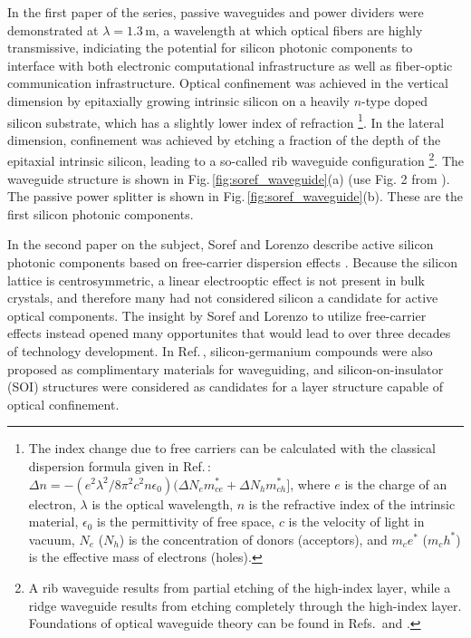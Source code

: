In the first paper of the series, passive waveguides and power dividers were demonstrated at $\lambda = 1.3$\,\textmu m, a wavelength at which optical fibers are highly transmissive, indiciating the potential for silicon photonic components to interface with both electronic computational infrastructure as well as fiber-optic communication infrastructure. Optical confinement was achieved in the vertical dimension by epitaxially growing intrinsic silicon on a heavily $n$-type doped silicon substrate, which has a slightly lower index of refraction \footnote{The index change due to free carriers can be calculated with the classical dispersion formula given in Ref.\,\cite{sole1985}: $\Delta n = -(e^2\lambda^2/8\pi^2 c^2n\epsilon_0)(\Delta N_em_{ce}^*+\Delta N_hm_{ch}^*]$, where $e$ is the charge of an electron, $\lambda$ is the optical wavelength, $n$ is the refractive index of the intrinsic material, $\epsilon_0$ is the permittivity of free space, $c$ is the velocity of light in vacuum, $N_e$ ($N_h$) is the concentration of donors (acceptors), and $m_ce^*$ ($m_ch^*$) is the effective mass of electrons (holes).}. In the lateral dimension, confinement was achieved by etching a fraction of the depth of the epitaxial intrinsic silicon, leading to a so-called rib waveguide configuration \footnote{A rib waveguide results from partial etching of the high-index layer, while a ridge waveguide results from etching completely through the high-index layer. Foundations of optical waveguide theory can be found in Refs.\,\cite{snlo1983} and \cite{hu2009}.}. The waveguide structure is shown in Fig.\,\ref{fig:soref_waveguide}(a) (use Fig. 2 from \cite{sole1985}). The passive power splitter is shown in Fig.\,\ref{fig:soref_waveguide}(b). These are the first silicon photonic components.

In the second paper on the subject, Soref and Lorenzo describe active silicon photonic components based on free-carrier dispersion effects \cite{solo1986}. Because the silicon lattice is centrosymmetric, a linear electrooptic effect is not present in bulk crystals, and therefore many had not considered silicon a candidate for active optical components. The insight by Soref and Lorenzo to utilize free-carrier effects instead opened many opportunites that would lead to over three decades of technology development. In Ref.\,, silicon-germanium compounds were also proposed as complimentary materials for waveguiding, and silicon-on-insulator (SOI) structures were considered as candidates for a layer structure capable of optical confinement.

